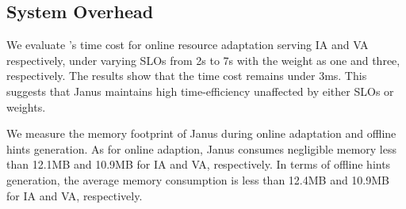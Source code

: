 \subsection{System Overhead}
\label{exp:micro:overhead}
We evaluate \namex's time cost for online resource adaptation serving IA and VA respectively, under varying SLOs from 2s to 7s with the weight as one and three, respectively.
The results show that the time cost remains under 3ms.
This suggests that Janus maintains high time-efficiency unaffected by either SLOs or weights. 

We measure the memory footprint of Janus during online adaptation and offline hints generation.
As for online adaption, Janus consumes negligible memory less than 12.1MB and 10.9MB for IA and VA, respectively.
In terms of offline hints generation, the average memory consumption is less than 12.4MB and 10.9MB for IA and VA, respectively.

